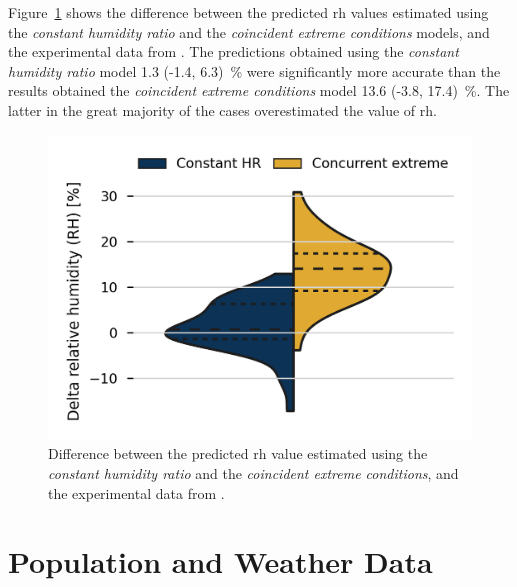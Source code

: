 Figure~\ref{fig:delta_rh} shows the difference between the predicted \ac{rh} values estimated using the \textit{constant humidity ratio} and the \textit{coincident extreme conditions} models, and the experimental data from .
The predictions obtained using the \textit{constant humidity ratio} model 1.3 (-1.4, 6.3)~\% were significantly more accurate than the results obtained the \textit{coincident extreme conditions} model 13.6 (-3.8, 17.4)~\%.
The latter in the great majority of the cases overestimated the value of \ac{rh}.

\begin{figure}[h]
    \centering
    \includegraphics[width=\textwidth]{figures/delta_rh}
    \caption{Difference between the predicted \ac{rh} value estimated using the \textit{constant humidity ratio} and the \textit{coincident extreme conditions}, and the experimental data from .}
    \label{fig:delta_rh}
\end{figure}

\section{Population and Weather Data}\label{sec:pop_weather}

